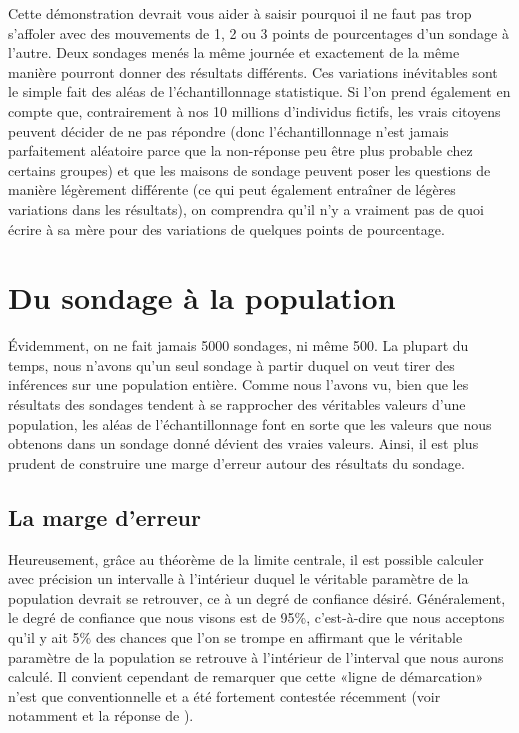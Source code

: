 \documentclass[
]{book}
\begin{document}
Cette démonstration devrait vous aider à saisir pourquoi il ne faut pas trop s'affoler avec des mouvements de 1, 2 ou 3 points de pourcentages d'un sondage à l'autre. Deux sondages menés la même journée et exactement de la même manière pourront donner des résultats différents. Ces variations inévitables sont le simple fait des aléas de l'échantillonnage statistique. Si l'on prend également en compte que, contrairement à nos 10 millions d'individus fictifs, les vrais citoyens peuvent décider de ne pas répondre (donc l'échantillonnage n'est jamais parfaitement aléatoire parce que la non-réponse peu être plus probable chez certains groupes) et que les maisons de sondage peuvent poser les questions de manière légèrement différente (ce qui peut également entraîner de légères variations dans les résultats), on comprendra qu'il n'y a vraiment pas de quoi écrire à sa mère pour des variations de quelques points de pourcentage.

\hypertarget{du-sondage-uxe0-la-population}{%
\section{Du sondage à la population}\label{du-sondage-uxe0-la-population}}

Évidemment, on ne fait jamais 5000 sondages, ni même 500. La plupart du temps, nous n'avons qu'un seul sondage à partir duquel on veut tirer des inférences sur une population entière. Comme nous l'avons vu, bien que les résultats des sondages tendent à se rapprocher des véritables valeurs d'une population, les aléas de l'échantillonnage font en sorte que les valeurs que nous obtenons dans un sondage donné dévient des vraies valeurs. Ainsi, il est plus prudent de construire une marge d'erreur autour des résultats du sondage.

\hypertarget{la-marge-derreur}{%
\subsection{La marge d'erreur}\label{la-marge-derreur}}

Heureusement, grâce au théorème de la limite centrale, il est possible calculer avec précision un intervalle à l'intérieur duquel le véritable paramètre de la population devrait se retrouver, ce à un degré de confiance désiré. Généralement, le degré de confiance que nous visons est de 95\%, c'est-à-dire que nous acceptons qu'il y ait 5\% des chances que l'on se trompe en affirmant que le véritable paramètre de la population se retrouve à l'intérieur de l'interval que nous aurons calculé. Il convient cependant de remarquer que cette «ligne de démarcation» n'est que conventionnelle et a été fortement contestée récemment (voir notamment \citet{Benjamin2017} et la réponse de \citet{Lakens2018}).
\end{document}
